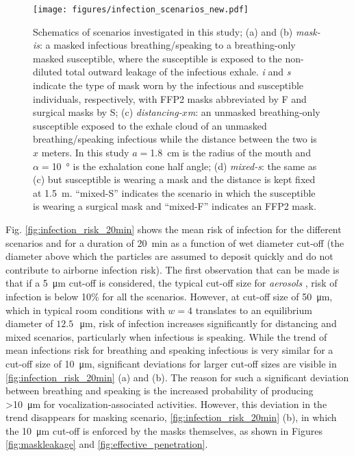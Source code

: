 \documentclass[preprint]{elsarticle}
\begin{document}
\begin{figure}[htbp]
	\centering
	\texttt{[image: figures/infection\_scenarios\_new.pdf]}
	\caption{Schematics of scenarios investigated in this study; (a) and (b) \emph{mask-is}: a masked infectious breathing/speaking to a breathing-only masked susceptible, where the susceptible is exposed to the non-diluted total outward leakage of the infectious exhale. \emph{i} and \emph{s} indicate the type of mask worn by the infectious and susceptible individuals, respectively, with FFP2 masks abbreviated by F and surgical masks by S; (c) \emph{distancing-$x$m}: an unmasked breathing-only susceptible exposed to the exhale cloud of an unmasked breathing/speaking infectious while the distance between the two is $x$ meters. In this study $a=$\SI{1.8}{\centi\meter} is the radius of the mouth  and $\alpha=$\SI{10}{\degree} is the exhalation cone half angle; (d) \emph{mixed-s}: the same as (c) but susceptible is wearing a mask and the distance is kept fixed at \SI{1.5}{\meter}. \enquote{mixed-S} indicates the scenario in which the susceptible is wearing a surgical mask and \enquote{mixed-F} indicates an FFP2 mask. }
	\label{fig:scenarios}
\end{figure}
Fig. \ref{fig:infection_risk_20min} shows the mean risk of infection for the different scenarios and for a duration of \SI{20}{\minute} as a function of wet diameter cut-off (the diameter above which the particles are assumed to deposit quickly and do not contribute to airborne infection risk). 
The first observation that can be made is that if a \SI{5}{\micro\meter} cut-off is considered, the typical cut-off size for \emph{aerosols} \cite{Pohlker2021, randall2021did}, risk of infection is below 10\% for all the scenarios. 
However, at cut-off size of \SI{50}{\micro\meter}, which in typical room conditions with $w=4$ translates to an equilibrium diameter of $ 12.5\,$\SI{}{\micro\meter}, risk of infection increases significantly for distancing and mixed scenarios, particularly when infectious is speaking. 
While the trend of mean infections risk for breathing and speaking infectious is very similar for a cut-off size of \SI{10}{\micro\meter}, significant deviations for larger cut-off sizes are visible in \ref{fig:infection_risk_20min} (a) and (b). 
The reason for such a significant deviation between breathing and speaking is the increased probability of producing \textgreater\SI{10}{\micro\meter} for vocalization-associated activities. However, this deviation in the trend disappears for masking scenario, \ref{fig:infection_risk_20min} (b), in which the \SI{10}{\micro\meter} cut-off is enforced by the masks themselves, as shown in Figures \ref{fig:maskleakage} and \ref{fig:effective_penetration}.
\end{document}
